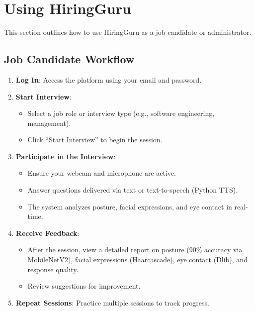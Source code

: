 \section{Using HiringGuru}
This section outlines how to use HiringGuru as a job candidate or administrator.

\subsection{Job Candidate Workflow}
\begin{enumerate}
    \item \textbf{Log In}: Access the platform using your email and password.
    \item \textbf{Start Interview}:
        \begin{itemize}
            \item Select a job role or interview type (e.g., software engineering, management).
            \item Click ``Start Interview'' to begin the session.
        \end{itemize}
    \item \textbf{Participate in the Interview}:
        \begin{itemize}
            \item Ensure your webcam and microphone are active.
            \item Answer questions delivered via text or text-to-speech (Python TTS).
            \item The system analyzes posture, facial expressions, and eye contact in real-time.
        \end{itemize}
    \item \textbf{Receive Feedback}:
        \begin{itemize}
            \item After the session, view a detailed report on posture (90\% accuracy via MobileNetV2), facial expressions (Haarcascade), eye contact (Dlib), and response quality.
            \item Review suggestions for improvement.
        \end{itemize}
    \item \textbf{Repeat Sessions}: Practice multiple sessions to track progress.
\end{enumerate}

